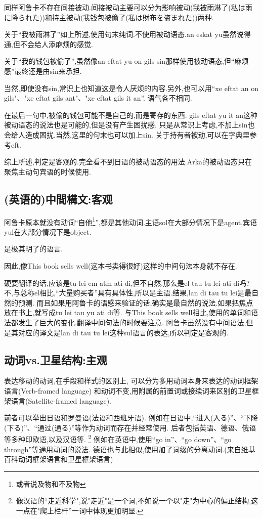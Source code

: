 同样阿鲁卡不存在间接被动.间接被动主要可以分为影响被动(我被雨淋了(私は雨に降られた))和持主被动(我钱包被偷了(私は財布を盗まれた))两种.

关于“我被雨淋了”如上所述,使用句末纯词.不使用被动语态.an eskat yu虽然说得通,但不会给人添麻烦的感觉.

关于“我的钱包被偷了”,虽然像an eftat yu on gils sin那样使用被动语态,但``麻烦感''最终还是由sin来承担.

当然,即使没有sin,常识上也知道这是令人厌烦的内容.另外,也可以用``xe eftat an on gils"、"xe eftat gils ant"、"xe eftat gils it an''.
语气各不相同.

在最后一句中,被偷的钱包可能不是自己的,而是寄存的东西.
gils eftat yu it an这种被动语态的说法也是可能的,但是没有产生困扰感.
只是从常识上考虑,不加上sin也会给人造成困扰.当然,这里的句末也可以加上sin.
关于持有者被动,可以在字典里参考eft.

综上所述,判定是客观的.完全看不到日语的被动语态的用法.Arka的被动语态只在聚焦主动句宾语的时候使用.

\subsection{(英语的)中間構文:客观}

阿鲁卡原本就没有动词“自他\footnote{或者说及物和不及物}”,都是其他动词.主语sol在大部分情况下是agent,宾语yul在大部分情况下是object.

是极其明了的语言.

因此,像This book sells well(这本书卖得很好)这样的中间句法本身就不存在.

硬要翻译的话,应该是tu lei em atm ati di,但不自然.那么是el tau tu lei ati di吗?
不,与总称el相比,“大量购买者”具有具体性,所以是主语.结果,lan di tau tu lei是最自然的预测.
而且如果用阿鲁卡的语感来验证的话,确实是最自然的说法.如果把焦点放在书上,就写成tu lei tau yu ati di等.
与This book sells well相比,使用的单词和语法都发生了巨大的变化.翻译中间句法的时候要注意.
阿鲁卡虽然没有中间语法,但是其对应的译文是lan di tau tu lei这种sul语言的表达,所以判定是客观的.

\subsection{动词vs.卫星结构:主观}
表达移动的动词,在手段和样式的区别上,
可以分为多用动词本身来表达的动词框架语言(Verb-framed language)
和动词不变,用附属的前置词或接续词来区别的卫星框架语言(Satellite-framed language).

前者可以举出日语和罗曼语(法语和西班牙语).
例如在日语中,“进入(入る)”、“下降(下る)”、“通过(通る)”等作为动词而存在并经常使用.
后者包括英语、德语、俄语等多种印欧语,以及汉语等.
\footnote{像汉语的``走近科学",说"走近"是一个词,不如说一个以"走"为中心的偏正结构,这一点在"爬上栏杆''一词中体现更加明显.}
例如在英语中,使用“go in”、“go down”、“go through”等通用动词的说法.
德语也与此相似,使用加了词缀的分离动词.(来自维基百科动词框架语言和卫星框架语言)

